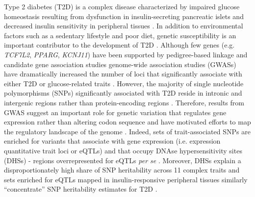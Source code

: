 \documentclass[10pt]{article}
\begin{document}
Type 2 diabetes (T2D) is a complex disease characterized by impaired glucose homeostasis resulting from dysfunction in insulin-secreting pancreatic islets and decreased insulin sensitivity in peripheral tissues \cite{DeFronzo2009a}. In addition to environmental factors such as a sedentary lifestyle and poor diet, genetic susceptibility is an important contributor to the development of T2D \cite{Billings2010a}. Although few genes (e.g. \textit{TCF7L2}, \textit{PPARG}, \textit{KCNJ11}) have been supported by pedigree-based linkage and candidate gene association studies \cite{Reynisdottir2003, Altshuler2000a, Gloyn2003a, Grant2006} genome-wide association studies (GWASs) have dramatically increased the number of loci that significantly associate with either T2D or glucose-related traits \cite{Voight2010a, Replication2014,Billings2010a}.  However, the majority of single nucleotide polymorphisms (SNPs) significantly associated with T2D reside in intronic and intergenic regions rather than protein-encoding regions \cite{Hindorff2009, Visscher2012a}. Therefore, results from GWAS suggest an important role for genetic variation that regulates gene expression rather than altering codon sequence \cite{Albert2015} and have motivated efforts to map the regulatory landscape of the genome \cite{Lonsdale2013, TheGTExConsortium2015, Battle2014}.  Indeed, sets of trait-associated SNPs are enriched for variants that associate with gene expression (i.e. expression quantitative trait loci or eQTLs) \cite{Nicolae2010b} and that occupy DNAse hypersensitivity sites (DHSs) \cite{Maurano2012} - regions overrepresented for eQTLs \textit{per se} \cite{Degner2012}. Moreover, DHSs explain a disproportionately high share of SNP heritability \cite{JianYangMichaelEGoddardPeterMVisscheretal.2010} across 11 complex traits \cite{Gusev2014} and sets enriched for eQTLs mapped in insulin-responsive peripheral tissues similarly ``concentrate'' SNP heritability estimates for T2D \cite{Torres2014}.
\end{document}
